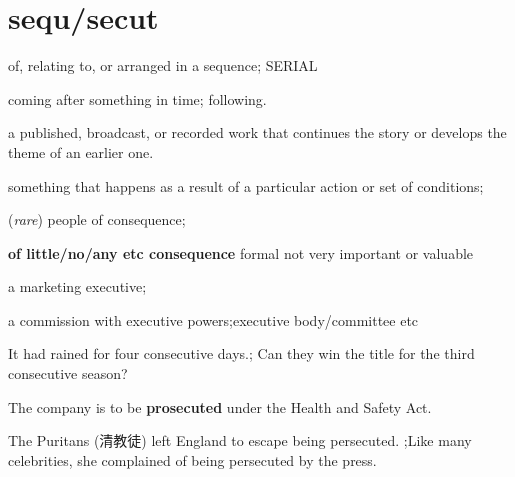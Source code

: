 \chapter{sequ/secut}

\begin{vocabulary}
    of, relating to, or arranged in a sequence; SERIAL
\end{vocabulary}

\begin{vocabulary}
    coming after something in time; following.
\end{vocabulary}

\begin{vocabulary}[sequel]
    a published, broadcast, or recorded work that continues the story or develops the theme of an earlier one.
\end{vocabulary}

\begin{vocabulary}
    something that happens as a result of a particular action or set of conditions; 
    
    (\textit{rare}) people of consequence; 
    
    \textbf{of little/no/any etc consequence} formal not very important or valuable
\end{vocabulary}

\begin{vocabulary}
    a marketing executive; 
    
    a commission with executive powers;executive body/committee etc
\end{vocabulary}

\begin{vocabulary}[consecutive]
    It had rained for four consecutive days.;
    Can they win the title for the third consecutive season?
\end{vocabulary}

\begin{vocabulary}
    The company is to be \textbf{prosecuted} under the Health and Safety Act.
\end{vocabulary}

\begin{vocabulary}[presecute]
    The Puritans (清教徒) left England to escape being persecuted. ;Like many celebrities, she complained of being persecuted by the press.
\end{vocabulary}
